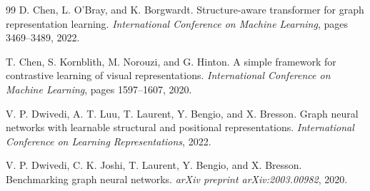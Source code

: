 \documentclass[twocolumn, a4paper, 10pt]{article}
\begin{document}
\begin{thebibliography}{99}
D. Chen, L. O'Bray, and K. Borgwardt.
Structure-aware transformer for graph representation learning.
\textit{International Conference on Machine Learning}, pages 3469--3489, 2022.

T. Chen, S. Kornblith, M. Norouzi, and G. Hinton.
A simple framework for contrastive learning of visual representations.
\textit{International Conference on Machine Learning}, pages 1597--1607, 2020.

V. P. Dwivedi, A. T. Luu, T. Laurent, Y. Bengio, and X. Bresson.
Graph neural networks with learnable structural and positional representations.
\textit{International Conference on Learning Representations}, 2022.

V. P. Dwivedi, C. K. Joshi, T. Laurent, Y. Bengio, and X. Bresson.
Benchmarking graph neural networks.
\textit{arXiv preprint arXiv:2003.00982}, 2020.

\end{thebibliography}
\end{document}

